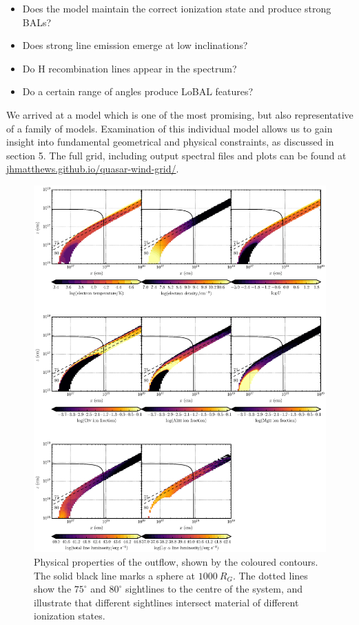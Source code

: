 \documentclass[preprint, a4paper, 11pt]{aastex}
\begin{document}
\begin{itemize}
\item Does the model maintain the correct ionization state and produce strong BALs?
\item Does strong line emission emerge at low inclinations?
\item Do H recombination lines appear in the spectrum?
\item Do a certain range of angles produce LoBAL features?
\end{itemize}

We arrived at a model which is one of the most promising,
but also representative of a family of models. Examination 
of this individual model allows us to gain insight
into fundamental geometrical and physical constraints, 
as discussed in section 5. 
The full grid, including output spectral files and plots can be found at
\url{jhmatthews.github.io/quasar-wind-grid/}.


\begin{figure} %
\centering
\includegraphics[width=1.0\textwidth]{figures/wind.eps}
\caption
{
Physical properties of the outflow, shown by the coloured contours.
The solid black line marks a sphere at $1000~R_G$.
The dotted lines show the $75^\circ$ and $80^\circ$ sightlines 
to the centre of the system, and illustrate that different sightlines
intersect material of different ionization states.
}
\label{fig:uvspec}
\end{figure} %
\end{document}
